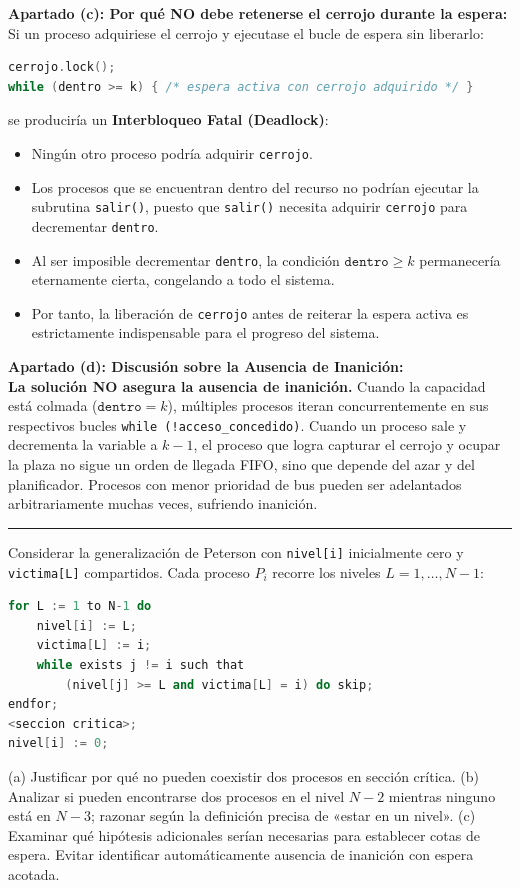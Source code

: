 \documentclass[11pt,a4paper,twoside,openright]{report}
\begin{document}
\begin{solucion}
\textbf{Apartado (c): Por qué NO debe retenerse el cerrojo durante la espera:}\\
Si un proceso adquiriese el cerrojo y ejecutase el bucle de espera sin liberarlo:
\begin{lstlisting}[language=C++]
cerrojo.lock();
while (dentro >= k) { /* espera activa con cerrojo adquirido */ }
\end{lstlisting}
se produciría un \textbf{Interbloqueo Fatal (Deadlock)}:
\begin{itemize}[leftmargin=*]
    \item Ningún otro proceso podría adquirir \texttt{cerrojo}.
    \item Los procesos que se encuentran dentro del recurso no podrían ejecutar la subrutina \texttt{salir()}, puesto que \texttt{salir()} necesita adquirir \texttt{cerrojo} para decrementar \texttt{dentro}.
    \item Al ser imposible decrementar \texttt{dentro}, la condición $\texttt{dentro} \ge k$ permanecería eternamente cierta, congelando a todo el sistema.
    \item Por tanto, la liberación de \texttt{cerrojo} antes de reiterar la espera activa es estrictamente indispensable para el progreso del sistema.
\end{itemize}

\textbf{Apartado (d): Discusión sobre la Ausencia de Inanición:}\\
\textbf{La solución NO asegura la ausencia de inanición.}
Cuando la capacidad está colmada ($\texttt{dentro} = k$), múltiples procesos iteran concurrentemente en sus respectivos bucles \texttt{while (!acceso\_concedido)}. Cuando un proceso sale y decrementa la variable a $k-1$, el proceso que logra capturar el cerrojo y ocupar la plaza no sigue un orden de llegada FIFO, sino que depende del azar y del planificador. Procesos con menor prioridad de bus pueden ser adelantados arbitrariamente muchas veces, sufriendo inanición.
\end{solucion}

\vspace{15pt}
\hrule
\vspace{15pt}

\begin{ejercicio}
Considerar la generalización de Peterson con \texttt{nivel[i]} inicialmente cero y \texttt{victima[L]} compartidos. Cada proceso $P_i$ recorre los niveles $L = 1, \dots, N-1$:
\begin{lstlisting}[language=C++]
for L := 1 to N-1 do
    nivel[i] := L;
    victima[L] := i;
    while exists j != i such that
        (nivel[j] >= L and victima[L] = i) do skip;
endfor;
<seccion critica>;
nivel[i] := 0;
\end{lstlisting}
(a) Justificar por qué no pueden coexistir dos procesos en sección crítica. (b) Analizar si pueden encontrarse dos procesos en el nivel $N-2$ mientras ninguno está en $N-3$; razonar según la definición precisa de «estar en un nivel». (c) Examinar qué hipótesis adicionales serían necesarias para establecer cotas de espera. Evitar identificar automáticamente ausencia de inanición con espera acotada.
\end{ejercicio}
\end{document}
